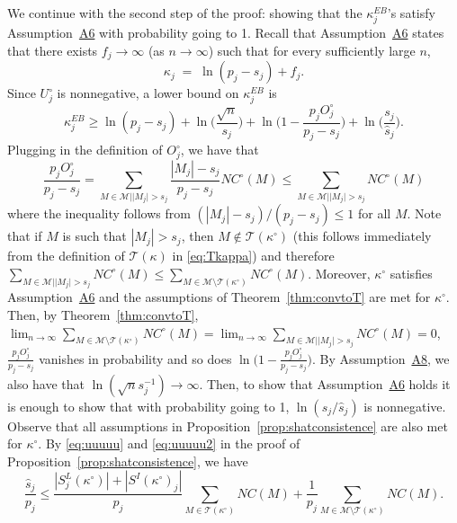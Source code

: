 \documentclass[bj,authoryear]{imsart}
\theoremstyle{plain}
\newcommand{\M}{\mathcal{M}}
\newcommand{\T}{\mathcal{T}}
\begin{document}
We continue with the second step of the proof: showing that the $\kappa^{EB}_j$'s satisfy Assumption~\hyperlink{lab:A6}{A6} with probability going to 1. Recall that Assumption~\hyperlink{lab:A6}{A6} states that there exists $f_j\to \infty$ (as $n\to \infty$) such that for every sufficiently large $n$,
\begin{equation*}
    \kappa_j \;=\;\ln(p_j-s_j) + f_j.
\end{equation*}
Since $U_j^{\circ}$ is nonnegative, a lower bound on $\kappa^{EB}_j$ is %
\begin{equation}\label{eq:decompstep2pen2}
    \kappa^{EB}_j
    \geq  \ln(p_j-s_j)+\ln\Big(\frac{\sqrt{n}}{s_j}\Big)+\ln\Big(1-\frac{p_j O^{\circ}_j}{p_j-s_j}\Big)+\ln\Big(\frac{s_j}{\widehat{s}_j}\Big).
\end{equation}
Plugging in the definition of $O^{\circ}_j$, we have that
$$\frac{p_j O^{\circ}_j}{p_j-s_j} =  \sum_{M \in \M | |M_j| > s_j}\frac{|M_j|-s_j}{p_j-s_j}NC^{\circ}(M)\leq \sum_{M \in \M | |M_j| > s_j}NC^{\circ}(M)$$
where the inequality follows from $(|M_j|-s_j)/(p_j-s_j)\leq 1$ for all $M$.
Note that if $M$ is such that $|M_j|>s_j$, then $M\not\in\T(\kappa^{\circ})$ (this follows immediately from the definition of $\T(\kappa)$ in \eqref{eq:Tkappa})  and therefore $\sum_{M \in \M | |M_j| > s_j}NC^{\circ}(M)\leq \sum_{M \in \M \setminus \T(\kappa^{\circ})}NC^{\circ}(M)$. Moreover, $\kappa^{\circ}$ satisfies Assumption~\hyperlink{lab:A6}{A6} and the assumptions of Theorem~\ref{thm:convtoT} are met for $\kappa^{\circ}$.
Then, by Theorem~\ref{thm:convtoT}, $\lim_{n\to\infty} \sum_{M \in \M \setminus \T(\kappa^{\circ})}NC^{\circ}(M)=\lim_{n\to\infty}\sum_{M \in \M | |M_j| > s_j}NC^{\circ}(M) = 0$, $\frac{p_j O^{\circ}_j}{p_j-s_j}$ vanishes in probability and so does $\ln\Big(1-\frac{p_j O^{\circ}_j}{p_j-s_j}\Big)$. By Assumption~\hyperlink{lab:A8}{A8}, we also have that $\ln(\sqrt{n}s_j^{-1})\to\infty$. 
Then, to show that Assumption~\hyperlink{lab:A6}{A6} holds it is enough to show that with probability going to 1, $\ln(s_j/\widehat{s}_j)$ is nonnegative. Observe that all assumptions in Proposition~\ref{prop:shatconsistence} are also met for $\kappa^{\circ}$. By \eqref{eq:uuuuu} and \eqref{eq:uuuuu2} in the proof of Proposition~\ref{prop:shatconsistence}, we have
\begin{equation*}
    \frac{\widehat{s}_j}{p_j}\leq \frac{|S^{L}_j(\kappa^{\circ})|+|S^{I}(\kappa^{\circ})_j|}{p_j}\sum_{M \in \T(\kappa^{\circ})}NC(M) + \frac{1}{p_j} \sum_{M \in \M\setminus \T(\kappa^{\circ})}NC(M).
\end{equation*}
\end{document}
